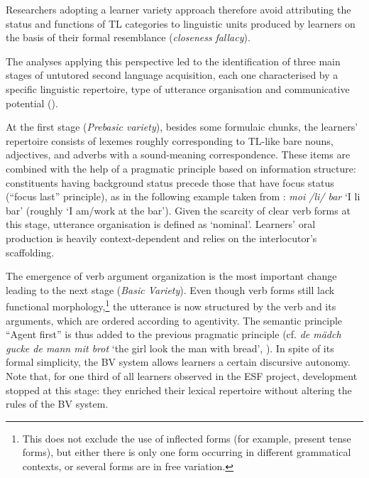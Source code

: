 \documentclass[output=paper]{langscibook}
\begin{document}
Researchers adopting a learner variety approach therefore avoid attributing the status and functions of TL categories to linguistic units produced by learners on the basis of their formal resemblance (\textit{closeness} \textit{fallacy}).  

The analyses applying this perspective led to the identification of three main stages of untutored second language acquisition, each one characterised by a specific linguistic repertoire, type of utterance organisation and communicative potential (\citealt{KleinPerdue1992, DietrichEtAl1995}).

At the first stage (\textit{Prebasic variety}), besides some formulaic chunks, the learners’ repertoire consists of lexemes roughly corresponding to TL-like bare nouns, adjectives, and adverbs with a sound-meaning correspondence. These items are combined with the help of a pragmatic principle based on information structure: constituents having background status precede those that have focus status (“focus last” principle), as in the following example taken from \citet{Véronique2013dislocation}: \textit{moi /li/ bar} ‘I li bar’ (roughly ‘I am\slash work at the bar’). Given the scarcity of clear verb forms at this stage, utterance organisation is defined as ‘nominal’. Learners’ oral production is heavily context-dependent and relies on the interlocutor’s scaffolding. 


The emergence of verb argument organization is the most important change leading to the next stage (\textit{Basic Variety}). Even though verb forms still lack functional morphology,\footnote{This does not exclude the use of inflected forms (for example, present tense forms), but either there is only one form occurring in different grammatical contexts, or several forms are in free variation.} the utterance is now structured by the verb and its arguments, which are ordered according to agentivity. The semantic principle “Agent first” is thus added to the previous pragmatic principle (cf. \textit{de mädch gucke de mann mit brot} ‘the girl look the man with bread’, \citealt[319]{KleinPerdue1997}). In spite of its formal simplicity, the BV system allows learners a certain discursive autonomy. Note that, for one third of all learners observed in the ESF project, development stopped at this stage: they enriched their lexical repertoire without altering the rules of the BV system.
\end{document}
